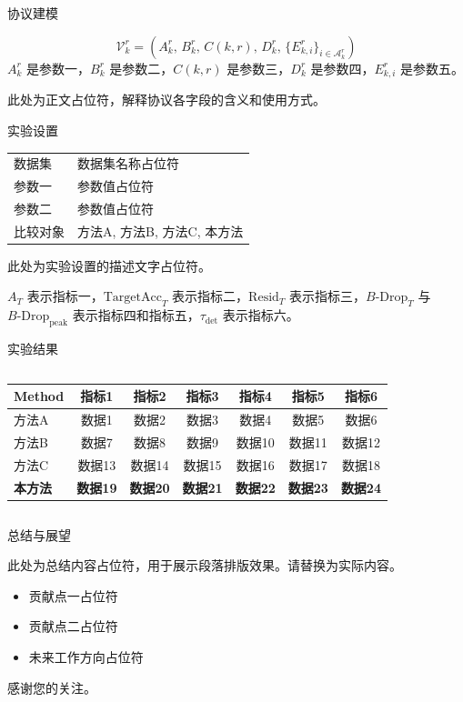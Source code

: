 \documentclass{beamer}
\newcommand{\Resid}{\mathrm{Resid}}
\newcommand{\Bdrop}{B\text{-}\mathrm{Drop}}
\newcommand{\taudet}{\tau_{\mathrm{det}}}
\newcommand{\AT}{A_T}
\newcommand{\pageheadline}[1]{\vspace{1mm}{\Large\textbf{\textcolor{maincolor}{#1}}}\par\vspace{1.5mm}}
\newcommand{\smallcap}[1]{{\small\textcolor{maincolor}{#1}}}
\newcommand{\plainpara}[1]{\par\noindent #1\par}
\begin{document}
\begin{frame}{协议建模}
\pageheadline{系统输入为多元组协议占位符}

\[
\mathcal{V}_k^r=
\left(
A_k^r,\,
B_k^r,\,
C(k,r),\,
D_k^r,\,
\{E_{k,i}^r\}_{i\in\mathcal{A}_k^r}
\right)
\]
\smallcap{$A_k^r$ 是参数一，$B_k^r$ 是参数二，$C(k,r)$ 是参数三，$D_k^r$ 是参数四，$E_{k,i}^r$ 是参数五。}

此处为正文占位符，解释协议各字段的含义和使用方式。
\end{frame}

\begin{frame}{实验设置}

\begin{table}
\centering
\small
\begin{tabular}{ll}
\toprule
数据集 & 数据集名称占位符 \\
参数一 & 参数值占位符 \\
参数二 & 参数值占位符 \\
比较对象 & 方法A, 方法B, 方法C, 本方法 \\
\bottomrule
\end{tabular}
\end{table}
\plainpara{此处为实验设置的描述文字占位符。}

$\AT$ 表示指标一，$\mathrm{TargetAcc}_T$ 表示指标二，$\Resid_T$ 表示指标三，$\Bdrop_T$ 与 $\Bdrop_{\mathrm{peak}}$ 表示指标四和指标五，$\taudet$ 表示指标六。

\end{frame}

\begin{frame}{实验结果}

\pageheadline{实验结果汇总占位符}
\begin{columns}[T,onlytextwidth]
\begin{table}
\centering
\small
\begin{tabular}{lcccccc}
\toprule
Method & 指标1 & 指标2 & 指标3 & 指标4 & 指标5 & 指标6 \\
\midrule
方法A  & 数据1 & 数据2 & 数据3 & 数据4 & 数据5 & 数据6 \\
方法B  & 数据7 & 数据8 & 数据9 & 数据10 & 数据11 & 数据12 \\
方法C  & 数据13 & 数据14 & 数据15 & 数据16 & 数据17 & 数据18 \\
\textbf{本方法} & \textbf{数据19} & \textbf{数据20} & \textbf{数据21} & \textbf{数据22} & \textbf{数据23} & \textbf{数据24} \\
\bottomrule
\end{tabular}
\end{table}

\end{columns}
\end{frame}

\begin{frame}{总结与展望}

此处为总结内容占位符，用于展示段落排版效果。请替换为实际内容。

\begin{itemize}
    \item 贡献点一占位符
    \item 贡献点二占位符
    \item 未来工作方向占位符
\end{itemize}

\vspace{2mm}
\smallcap{感谢您的关注。}
\end{frame}
\end{document}
